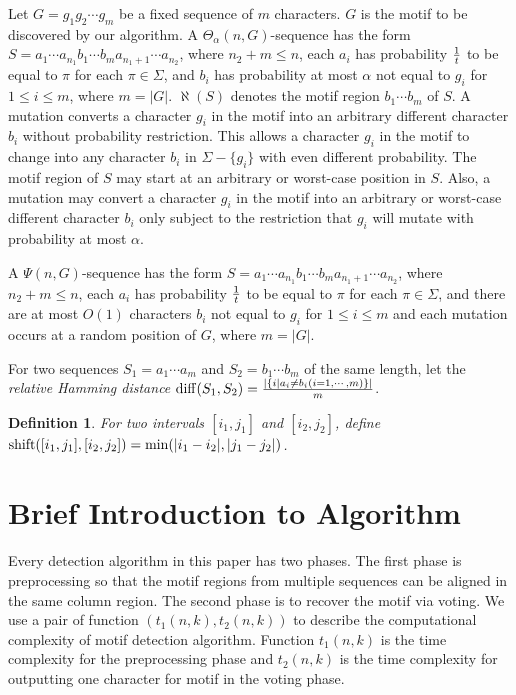 \documentclass[11pt]{article}
\newtheorem{dfntn}[theoremfoo]{Definition}
\newenvironment{definition}{\pagebreak[1]\begin{dfntn}\rm}{\end{dfntn}}
\newcommand{\shift}{{\rm shift}}
\newcommand{\diff}{{\rm diff}}
\begin{document}
Let $G=g_1g_2\cdots g_m$ be a fixed sequence of $m$ characters. $G$
is the motif to be discovered by our algorithm. A
$\Theta_{\alpha}(n,G)$-sequence has the form $S=a_1\cdots
a_{n_1}b_1\cdots b_m a_{n_1+1}\cdots a_{n_2}$, where $n_2+m\le n$,
each $a_i$ has probability ${1\over t}$ to be equal to $\pi$ for
each $\pi\in\Sigma$, and $b_i$ has probability at most $\alpha$ not
equal to $g_i$ for $1\le i\le m$, where $m=|G|$. $\aleph(S)$ denotes
the motif region $b_1\cdots b_m$ of $S$. A mutation converts a
character $g_i$ in  the motif into an arbitrary different character
$b_i$ without probability restriction. This allows a character $g_i$
in the motif to change into any character $b_i$ in $\Sigma-\{g_i\}$
with even different probability. The motif region of $S$ may start
at an arbitrary or worst-case position in $S$. Also, a mutation may
convert a character $g_i$ in the motif into an arbitrary or
worst-case different character $b_i$ only subject to the restriction
that $g_i$ will mutate with probability at most $\alpha$.


A $\Psi(n,G)$-sequence has the form $S=a_1\cdots a_{n_1}b_1\cdots
b_m a_{n_1+1}\cdots a_{n_2}$, where $n_2+m\le n$, each $a_i$ has
probability ${1\over t}$ to be equal to $\pi$ for each
$\pi\in\Sigma$, and there are at most $O(1)$ characters $b_i$ not
equal to $g_i$ for $1\le i\le m$ and each mutation occurs at a
random position of $G$, where $m=|G|$.






For two sequences $S_1=a_1\cdots a_m$ and $S_2=b_1\cdots b_m$ of the
same length, let the {\it relative Hamming distance} $\diff(S_1,
S_2)=\frac{|\{i| a_i\not= b_i(i=1,\cdots, m)\}|}{m}$.


\begin{definition}\label{shift-def}
For two intervals $[i_1, j_1]$ and $[i_2, j_2]$, define
$\shift([i_1, j_1], [i_2, j_2])=\min(|i_1-i_2|, |j_1-j_2|)$.
\end{definition}







\section{Brief Introduction to Algorithm}

Every detection algorithm in this paper has two phases. The first
phase is preprocessing so that the motif regions from multiple
sequences can be aligned in the same column region. The second phase
is to recover the motif via voting. We use a pair of function
$(t_1(n,k), t_2(n,k))$ to describe the computational complexity of
motif detection algorithm. Function $t_1(n,k)$ is the time
complexity for the preprocessing phase and $t_2(n,k)$ is the time
complexity for outputting one character for motif in the voting
phase.
\end{document}
